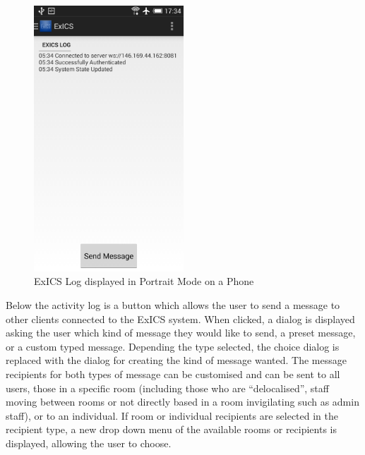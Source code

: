 \begin{figure}[!htpb]
	\centering
	\includegraphics[width=0.5\textwidth]{"screenshots/phone_portrait_activity_log"}
	\caption{ExICS Log displayed in Portrait Mode on a Phone}
	\label{fig:exics_log_phone_portrait}
\end{figure}

\FloatBarrier

Below the activity log is a button which allows the user to send a message to other clients connected to the ExICS system.  When clicked, a dialog is displayed asking the user which kind of message they would like to send, a preset message, or a custom typed message.  Depending the type selected, the choice dialog is replaced with the dialog for creating the kind of message wanted.  The message recipients for both types of message can be customised and can be sent to all users, those in a specific room (including those who are ``delocalised'', staff moving between rooms or not directly based in a room invigilating such as admin staff), or to an individual.  If room or individual recipients are selected in the recipient type, a new drop down menu of the available rooms or recipients is displayed, allowing the user to choose.

\FloatBarrier


